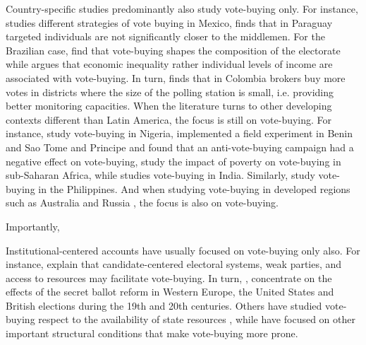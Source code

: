 \documentclass[onesided]{article}\usepackage[]{graphicx}\usepackage[]{color}
\begin{document}
Country-specific studies predominantly also study vote-buying only. For instance, \textcite{Diaz-Cayeros2012} studies different strategies of vote buying in Mexico, \textcite{Inan2012a} finds that in Paraguay targeted individuals are not significantly closer to the middlemen. For the Brazilian case, \textcite{Hidalgo2012,Hidalgo2016} find that vote-buying shapes the composition of the electorate while \textcite{Bahamonde2018} argues that economic inequality rather individual levels of income are associated with vote-buying. In turn, \textcite{Rueda2016} finds that in Colombia brokers buy more votes in districts where the size of the polling station is small, i.e. providing better monitoring capacities. When the literature turns to other developing contexts different than Latin America, the focus is still on vote-buying. For instance, \textcite{Bratton2008a,Rueda2014a} study vote-buying in Nigeria, \textcite{Vicente2009,Vicente2014} implemented a field experiment in Benin and Sao Tome and Principe and found that an anti-vote-buying campaign had a negative effect on vote-buying, \textcite{Jensen2013a} study the impact of poverty on vote-buying in sub-Saharan Africa, while \textcite{Heath2018} studies vote-buying in India. Similarly, \parencite{Khemani2015,Hicken2015,Hicken2018} study vote-buying in the Philippines. And when studying vote-buying in developed regions such as  Australia \parencite{Denemark2021} and Russia \parencite{Saikkonen2021}, the focus is also on vote-buying. 



Importantly,  \textcite{Gonzalez-Ocantos2012,GonzalezOcantos2014,KiewietDeJonge2015,Bahamonde2020a}







Institutional-centered accounts have usually focused on vote-buying only also. For instance, \textcite{Hicken2007} explain that candidate-centered electoral systems, weak parties, and access to resources may facilitate vote-buying. In turn, \textcite{Aidt2011}, concentrate on the effects of the secret ballot reform in Western Europe, the United States and British elections \textcite{Kam2016a} during the 19th and 20th centuries. Others have studied vote-buying respect to the availability of state resources \textcite{Gherghina2021a}, while \textcite{Kitschelt2000,Kitschelt2007,Kitschelt2015} have focused on other important structural conditions that make vote-buying more prone.


\end{document}

